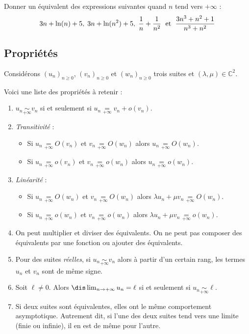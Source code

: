 \documentclass[a4paper,10pt]{report}
\begin{document}
\begin{exa} Donner un équivalent des expressions suivantes quand $n$ tend vers $+ \infty$ :
$$ 3n+\ln(n)+5, \;  3n+\ln(n^2)+5, \; \dfrac{1}{n} + \dfrac{1}{n^2} \; \hbox{ et } \; \dfrac{3n^3+n^2+1}{n^3+n^2}$$
\end{exa}

\subsection{Propriétés}

\noindent  Considérons $(u_n)_{n \geq 0}$, $(v_n)_{n \geq 0}$ et $(w_n)_{n \geq 0}$ trois suites et $(\lambda, \mu) \in \mathbb{C}^2$.

\noindent Voici une liste des propriétés à retenir :

\begin{enumerate}
\item $u_n  \underset{+ \infty}{\sim} v_n $ si et seulement si $u_n \underset{+ \infty}{=} v_n + o(v_n)$.
\item \textit{Transitivité} : 
\begin{itemize}
\item Si $u_n   \underset{+ \infty}{=}O(v_n)$ et $v_n   \underset{+ \infty}{=}O(w_n)$ alors $u_n   \underset{+ \infty}{=}O(w_n)$.
\item Si $u_n   \underset{+ \infty}{=}o(v_n)$ et $v_n   \underset{+ \infty}{=}o(w_n)$ alors $u_n   \underset{+ \infty}{=}o(w_n)$.
\end{itemize}
\item \textit{Linéarité} : 
\begin{itemize}
\item Si $u_n  \underset{+ \infty}{=}O(w_n)$ et $v_n \underset{+ \infty}{=}O(w_n)$ alors $\lambda u_n + \mu v_n  \underset{+ \infty}{=}O(w_n)$.
\item Si $u_n  \underset{+ \infty}{=}o(w_n)$ et $v_n \underset{+ \infty}{=}o(w_n)$ alors $\lambda u_n + \mu v_n  \underset{+ \infty}{=}o(w_n)$.
\end{itemize}
\item On peut multiplier et diviser des équivalents. On ne peut pas composer des équivalents par une fonction ou ajouter des équivalents.
\item Pour des suites \textit{réelles}, si $u_n  \underset{+ \infty}{\sim} v_n $ alors à partir d'un certain rang, les termes $u_n$ et $v_n$ sont de même signe. 

\begin{preuve}

\vspace{7cm}
\end{preuve}
\item Soit $\ell \neq 0$. Alors $\dis \lim_{n \rightarrow + \infty} u_n = \ell$ si et seulement si $u_n \underset{+ \infty}{\sim} \ell$.
\item Si deux suites sont équivalentes, elles ont le même comportement asymptotique. Autrement dit, si l'une des deux suites tend vers une limite (finie ou infinie), il en est de même pour l'autre.
\end{enumerate}
\end{document}
